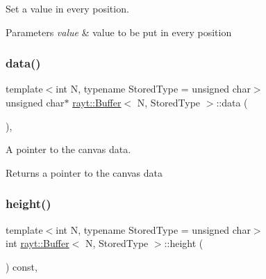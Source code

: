 Set a value in every position. 


\begin{DoxyParams}{Parameters}
{\em value} & value to be put in every position \\
\hline
\end{DoxyParams}
\mbox{\label{classrayt_1_1_buffer_a286e9c67444c67b3dc5734d0127549db}} 
\subsubsection{\texorpdfstring{data()}{data()}}
{\footnotesize\ttfamily template$<$int N, typename Stored\+Type = unsigned char$>$ \\
unsigned char$\ast$ \mbox{\hyperlink{classrayt_1_1_buffer}{rayt\+::\+Buffer}}$<$ N, Stored\+Type $>$\+::data (\begin{DoxyParamCaption}{ }\end{DoxyParamCaption})\hspace{0.3cm}{\ttfamily [inline]}, {\ttfamily [noexcept]}}



A pointer to the canvas data. 

\begin{DoxyReturn}{Returns}
a pointer to the canvas data 
\end{DoxyReturn}
\mbox{\label{classrayt_1_1_buffer_a575f281f1549488685df3b0a61489de9}} 
\subsubsection{\texorpdfstring{height()}{height()}}
{\footnotesize\ttfamily template$<$int N, typename Stored\+Type = unsigned char$>$ \\
int \mbox{\hyperlink{classrayt_1_1_buffer}{rayt\+::\+Buffer}}$<$ N, Stored\+Type $>$\+::height (\begin{DoxyParamCaption}{ }\end{DoxyParamCaption}) const\hspace{0.3cm}{\ttfamily [inline]}, {\ttfamily [noexcept]}}



